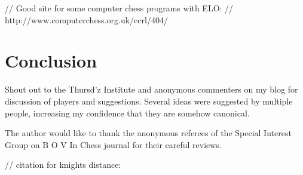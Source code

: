 \documentclass[10pt,preprint,twocolumn]{acmart}
\begin{document}



// Good site for some computer chess programs with ELO:
// http://www.computerchess.org.uk/ccrl/404/

\section{Conclusion}

Shout out to the Thursd'z Institute and anonymous commenters
on my blog for discussion of players and suggestions. Several
ideas were suggested by multiple people, increasing my confidence
that they are somehow canonical.

The author would like to thank the anonymous referees
of the Special Interest Group on
B
O
V
In
Chess journal for their careful reviews.

\nocite{elo1978rating}
\nocite{topple}
// citation for knights distance:
\nocite{miller2013counting}

% 


\end{document}

